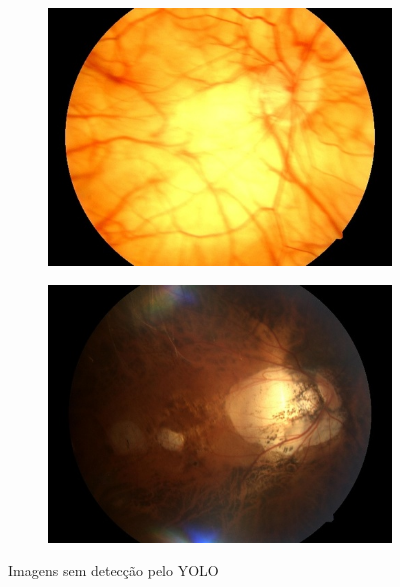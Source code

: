 \documentclass[12pt]{article}
\begin{document}
\begin{figure}
\begin{subfigure}[b]{0.47\textwidth}
        \includegraphics[width=\textwidth]{images/no_box/TRAIN046833_boxes.jpg}
        \label{fig:images_no_box_3}
    \end{subfigure}
    \hfill
    \begin{subfigure}[b]{0.47\textwidth}
        \centering
        \includegraphics[width=\textwidth]{images/no_box/TRAIN099284_boxes.jpg}
        \label{fig:images_no_box_4}
    \end{subfigure}
    \caption{Imagens sem detecção pelo YOLO}
    \label{fig:images_no_box}
\end{figure}

\end{document}
